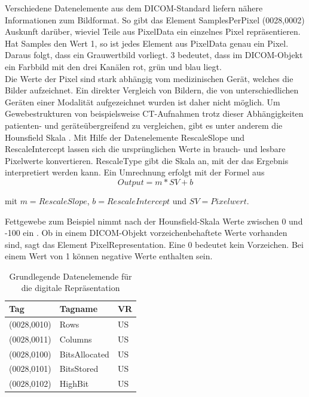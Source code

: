 Verschiedene Datenelemente aus dem DICOM-Standard liefern nähere Informationen zum Bildformat. So gibt das Element SamplesPerPixel (0028,0002) Auskunft darüber, wieviel Teile aus PixelData ein einzelnes Pixel repräsentieren. Hat Samples den Wert 1, so ist jedes Element aus PixelData genau ein Pixel. Daraus folgt, dass ein Grauwertbild vorliegt. 3 bedeutet, dass im DICOM-Objekt ein Farbbild mit den drei Kanälen rot, grün und blau liegt.\\
Die Werte der Pixel sind stark abhängig vom medizinischen Gerät, welches die Bilder aufzeichnet. Ein direkter Vergleich von Bildern, die von unterschiedlichen Geräten einer Modalität aufgezeichnet wurden ist daher nicht möglich. Um Gewebestrukturen von beispielsweise CT-Aufnahmen trotz dieser Abhängigkeiten patienten- und geräteübergreifend zu vergleichen, gibt es unter anderem die Hounsfield Skala \cite[2.1.3]{handels:mbv}. Mit Hilfe der Datenelemente RescaleSlope und RescaleIntercept lassen sich die ursprünglichen Werte in brauch- und lesbare Pixelwerte konvertieren. RescaleType gibt die Skala an, mit der das Ergebnis interpretiert werden kann. Ein Umrechnung erfolgt mit der Formel aus \cite[C.11-1b Seite 1168]{dicom:iod}\\

\begin{equation}
Output=m*SV+b
\label{rescale}
\end{equation}

mit $m = RescaleSlope$, $b = RescaleIntercept$ und $SV=Pixelwert$.

Fettgewebe zum Beispiel nimmt nach der Hounsfield-Skala Werte zwischen 0 und -100 ein \cite[Abbildung 1.18 Seite 15]{radio:hounsfield}. Ob in einem DICOM-Objekt vorzeichenbehaftete Werte vorhanden sind, sagt das Element PixelRepresentation. Eine 0 bedeutet kein Vorzeichen. Bei einem Wert von 1 können negative Werte enthalten sein.
\begin{table}
    \begin{tabularx}{\textwidth}{|X|X|X|}
    \toprule
    \hline
    \textbf{Tag}         & \textbf{Tagname}     & \textbf{VR} \\ \hline
    (0028,0010) 		 & Rows					& US 		  \\ \hline
    (0028,0011) 		 & Columns				& US 		  \\ \hline
    (0028,0100) 		 & BitsAllocated		& US 		  \\ \hline
    (0028,0101) 		 & BitsStored			& US 		  \\ \hline
    (0028,0102)			 & HighBit				& US 		  \\ \hline
    \bottomrule
    \end{tabularx}
    \caption {Grundlegende Datenelemende für die digitale Repräsentation}
    \label{table:digitalRep}
\end{table}

